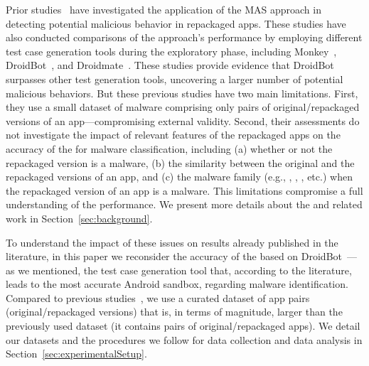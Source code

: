 Prior studies~\cite{DBLP:conf/wcre/BaoLL18,DBLP:journals/jss/CostaMMSSBNR22} have investigated the application of the MAS approach in detecting potential malicious behavior in repackaged apps. These studies have also conducted comparisons of the approach's performance by employing different test case generation tools during the exploratory phase, including Monkey~\cite{Monkey}, DroidBot~\cite{DBLP:conf/icse/LiYGC17}, and Droidmate~\cite{DBLP:conf/kbse/BorgesHZ18}.
These studies provide evidence that DroidBot surpasses other test generation tools, uncovering a larger number of potential malicious behaviors.
But these previous studies have two main limitations.
First, they use a small dataset of malware comprising only \appsSmall pairs of original/repackaged versions of an app---compromising external validity. Second, their assessments do not investigate
the impact of relevant features of the repackaged apps on the accuracy of the \mas for malware classification, including
(a) whether or not the repackaged version is a malware, (b) the similarity between the original and the repackaged versions of an app,
and (c) the malware family (e.g., , , , etc.) when the repackaged
version of an app is a malware. This limitations compromise a full understanding of the \mas performance. We present more details about the \mas and related work in Section~\ref{sec:background}.



To understand the impact of these issues on results already published in the literature, in this paper we reconsider the accuracy of the \mas based on
DroidBot~\cite{DBLP:conf/icse/LiYGC17}---as we mentioned, the test case generation tool that, according to the literature, leads to the most accurate Android sandbox, regarding malware identification. 
Compared to previous studies~\cite{DBLP:conf/wcre/BaoLL18,DBLP:conf/scam/CostaMCMVBC20},
we use a curated dataset of app pairs (original/repackaged versions) that is, in terms of magnitude, larger than the previously used
dataset (it contains \apps pairs of original/repackaged apps). We detail our datasets and the procedures we follow for data collection and data analysis in Section~\ref{sec:experimentalSetup}.
 
